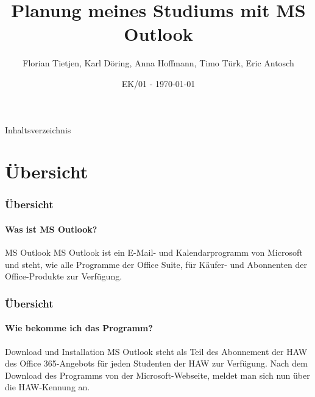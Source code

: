 \documentclass[usenames,dvipsnames,10pt]{beamer}
\title{Planung meines Studiums mit MS Outlook}
\date[ISPN ’80]{EK/01 - \today}
\author{Florian Tietjen, Karl Döring, Anna Hoffmann, Timo Türk, Eric Antosch}
\begin{document}
\begin{frame}
\titlepage
\end{frame}
\begin{frame}{Inhaltsverzeichnis}
    \tableofcontents
\end{frame}
\section{Übersicht}

\begin{frame} 
    
    \frametitle{Übersicht} 
    \framesubtitle{Was ist MS Outlook?}
    \begin{exampleblock}{MS Outlook}
        MS Outlook ist ein E-Mail- und Kalendarprogramm von Microsoft und steht,
        wie alle Programme der Office Suite, für Käufer- und Abonnenten der Office-Produkte
        zur Verfügung.
    \end{exampleblock} 
    
\end{frame}

\begin{frame} 
    
    \frametitle{Übersicht} 
    \framesubtitle{Wie bekomme ich das Programm?}
    \begin{exampleblock}{Download und Installation}
        MS Outlook steht als Teil des Abonnement der HAW des Office 365-Angebots
        für jeden Studenten der HAW zur Verfügung. Nach dem Download des Programms von 
        der Microsoft-Webseite, meldet man sich nun über die HAW-Kennung an. 
    \end{exampleblock} 
    
\end{frame}
\end{document}
